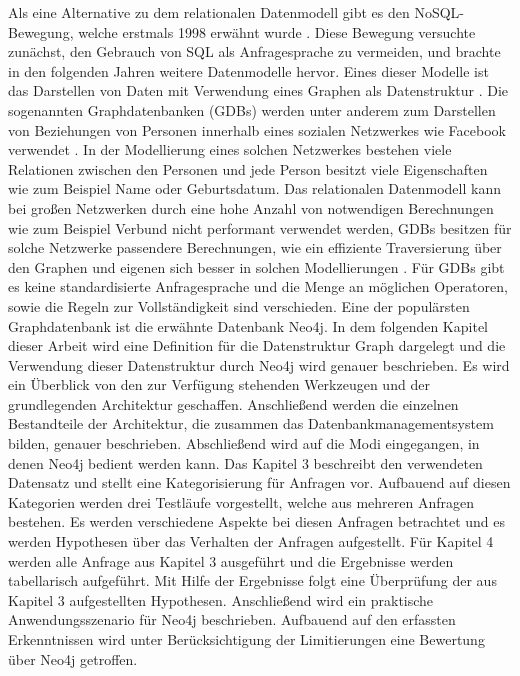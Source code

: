 Als eine Alternative zu dem relationalen Datenmodell gibt es den NoSQL-Bewegung, welche erstmals 1998 erwähnt wurde \parencite{NoSQL}. Diese Bewegung versuchte zunächst, den Gebrauch von SQL als Anfragesprache zu vermeiden, und brachte in den folgenden Jahren weitere Datenmodelle hervor. Eines dieser Modelle ist das Darstellen von Daten mit Verwendung eines Graphen als Datenstruktur \parencite{miller2013graph}. Die sogenannten Graphdatenbanken (GDBs) werden unter anderem zum Darstellen von Beziehungen von Personen innerhalb eines sozialen Netzwerkes wie Facebook verwendet \parencite{han2011survey}. In der Modellierung eines solchen Netzwerkes bestehen viele Relationen zwischen den Personen und jede Person besitzt viele Eigenschaften wie zum Beispiel Name oder Geburtsdatum. Das relationalen Datenmodell kann bei großen Netzwerken durch eine hohe Anzahl von notwendigen Berechnungen wie zum Beispiel Verbund nicht performant verwendet werden, GDBs besitzen für solche Netzwerke passendere Berechnungen, wie ein effiziente Traversierung über den Graphen und eigenen sich besser in solchen Modellierungen \parencite{miller2013graph}. Für GDBs gibt es keine standardisierte Anfragesprache und  die Menge an möglichen Operatoren, sowie die Regeln zur Vollständigkeit sind verschieden.
Eine der populärsten Graphdatenbank ist die erwähnte Datenbank Neo4j\parencite{francis2018cypher}.  \newline 
In dem folgenden Kapitel dieser Arbeit wird eine Definition für die Datenstruktur Graph dargelegt und die Verwendung dieser Datenstruktur durch Neo4j wird genauer beschrieben. Es wird ein Überblick von den zur Verfügung stehenden Werkzeugen und der grundlegenden Architektur geschaffen. Anschließend werden die einzelnen Bestandteile der Architektur, die zusammen das Datenbankmanagementsystem bilden, genauer beschrieben. Abschließend wird auf die Modi eingegangen, in denen Neo4j bedient werden
kann. \newline
Das Kapitel 3 beschreibt den verwendeten Datensatz und stellt eine Kategorisierung
für Anfragen vor. Aufbauend auf diesen Kategorien werden drei Testläufe vorgestellt, welche aus mehreren Anfragen bestehen. Es werden verschiedene Aspekte
bei diesen Anfragen betrachtet und es werden Hypothesen über das Verhalten der
Anfragen aufgestellt. \newline
Für Kapitel 4 werden alle Anfrage aus Kapitel 3 ausgeführt und die Ergebnisse werden tabellarisch aufgeführt. Mit Hilfe der Ergebnisse folgt eine Überprüfung der
aus Kapitel 3 aufgestellten Hypothesen. Anschließend wird ein praktische Anwendungsszenario für Neo4j beschrieben. Aufbauend auf den erfassten Erkenntnissen
wird unter Berücksichtigung der Limitierungen eine Bewertung über Neo4j getroffen.

